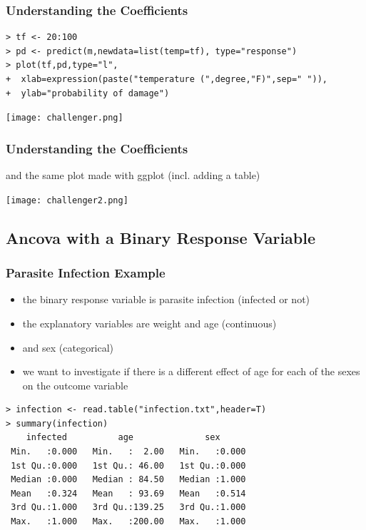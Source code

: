 \begin{frame}[fragile]\frametitle{Understanding the Coefficients}\footnotesize
\begin{verbatim}
> tf <- 20:100
> pd <- predict(m,newdata=list(temp=tf), type="response")
> plot(tf,pd,type="l",
+  xlab=expression(paste("temperature (",degree,"F)",sep=" ")),
+  ylab="probability of damage")
\end{verbatim}
\begin{center}
\texttt{[image: challenger.png]}
\end{center}
\end{frame}

\begin{frame}[fragile]\frametitle{Understanding the Coefficients}
and the same plot made with ggplot (incl. adding a table)
\begin{center}
\texttt{[image: challenger2.png]}
\end{center}
\end{frame}

\subsection[Binomial Ancova]{Ancova with a Binary Response Variable }

\begin{frame}[fragile]\frametitle{Parasite Infection Example}
\begin{itemize}
\item the binary response variable is parasite infection (infected or not) 
\item the explanatory variables are weight and age (continuous) 
\item and sex (categorical)
\item we want to investigate if there is a different effect of age for each of the sexes on the outcome variable
\end{itemize}
\begin{verbatim}
> infection <- read.table("infection.txt",header=T)
> summary(infection)
    infected          age              sex       
 Min.   :0.000   Min.   :  2.00   Min.   :0.000  
 1st Qu.:0.000   1st Qu.: 46.00   1st Qu.:0.000  
 Median :0.000   Median : 84.50   Median :1.000  
 Mean   :0.324   Mean   : 93.69   Mean   :0.514  
 3rd Qu.:1.000   3rd Qu.:139.25   3rd Qu.:1.000  
 Max.   :1.000   Max.   :200.00   Max.   :1.000  
\end{verbatim}
\end{frame}


